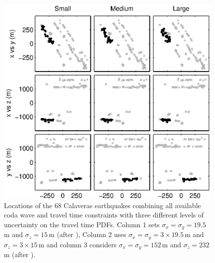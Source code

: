 \documentclass[draft,jgrga]{agutex}
\begin{document}
\begin{figure}
\noindent\includegraphics{diags/CalaverasLoc5.eps}
\caption{Locations of the 68 Calaveras earthquakes combining all available coda wave and travel time constraints with three different
levels of uncertainty on the travel time PDFs. Column 1 sets $\sigma_x = \sigma_y = 19.5$\,m and $\sigma_z = 15$\,m
(after \citealp{dr_Waldhauser08a}), Column 2 uses $\sigma_x = \sigma_y = 3 \times19.5$\,m and $\sigma_z = 3\times15$\,m and
column 3 considers $\sigma_x = \sigma_y = 152$\,m and $\sigma_z = 232$\,m (after \citealp{dr_Shearer97a}). }
\label{fig-68Calaverasevents_ttandcoda1}
\end{figure}
\end{document}
